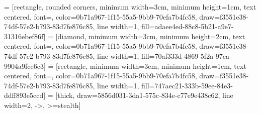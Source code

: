 
 = [rectangle, rounded corners, minimum width=3cm, minimum height=1cm, text centered, font=\normalsize, color=0b71a967-1f15-55a5-9bb9-70efa7b4fc58, draw=f3551e38-74df-57e2-b793-83d7fe876c85, line width=1, fill=adaee4ed-88c8-5b21-a9e7-31316ebef86f]
 = [diamond, minimum width=3cm, minimum height=2cm, text centered, font=\normalsize, color=0b71a967-1f15-55a5-9bb9-70efa7b4fc58, draw=f3551e38-74df-57e2-b793-83d7fe876c85, line width=1, fill=70af333d-4869-5f2a-97ca-9904a9fce6c3]
 = [rectangle, minimum width=3cm, minimum height=1cm, text centered, font=\normalsize, color=0b71a967-1f15-55a5-9bb9-70efa7b4fc58, draw=f3551e38-74df-57e2-b793-83d7fe876c85, line width=1, fill=747aec21-333b-59ee-84e3-ddff893e5ccd]
 = [thick, draw=5856d031-3da1-575c-834e-c77e9e438c62, line width=2, ->, >=stealth]

